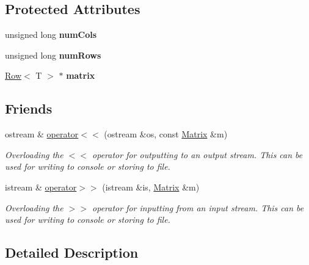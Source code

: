 \subsection*{Protected Attributes}
\begin{DoxyCompactItemize}
\item 
unsigned long {\bfseries num\+Cols}\hypertarget{class_matrix_a341aaedcfaac978957087bd0467dc527}{}\label{class_matrix_a341aaedcfaac978957087bd0467dc527}

\item 
unsigned long {\bfseries num\+Rows}\hypertarget{class_matrix_ac1e96667d48c7845708f978ddd17475d}{}\label{class_matrix_ac1e96667d48c7845708f978ddd17475d}

\item 
\hyperlink{class_row}{Row}$<$ T $>$ $\ast$ {\bfseries matrix}\hypertarget{class_matrix_a7a143ae112112155c9622ba17dc434c7}{}\label{class_matrix_a7a143ae112112155c9622ba17dc434c7}

\end{DoxyCompactItemize}
\subsection*{Friends}
\begin{DoxyCompactItemize}
\item 
ostream \& \hyperlink{class_matrix_a5ed9a90fd6f010e7e9840a17d92d5361}{operator$<$$<$} (ostream \&os, const \hyperlink{class_matrix}{Matrix} \&m)
\begin{DoxyCompactList}\small\item\em Overloading the $<$$<$ operator for outputting to an output stream. This can be used for writing to console or storing to file. \end{DoxyCompactList}\item 
istream \& \hyperlink{class_matrix_afcea9fa7d9a5052070fe1fda963ef237}{operator$>$$>$} (istream \&is, \hyperlink{class_matrix}{Matrix} \&m)
\begin{DoxyCompactList}\small\item\em Overloading the $>$$>$ operator for inputting from an input stream. This can be used for writing to console or storing to file. \end{DoxyCompactList}\end{DoxyCompactItemize}


\subsection{Detailed Description}
